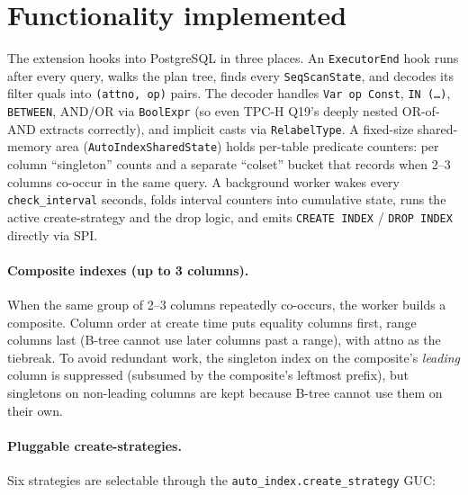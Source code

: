 \documentclass[10pt,a4paper]{article}
\newcommand{\code}[1]{\texttt{\small #1}}
\begin{document}
\section{Functionality implemented}

The extension hooks into PostgreSQL in three places. An
\code{ExecutorEnd} hook runs after every query, walks the plan tree,
finds every \code{SeqScanState}, and decodes its filter quals into
\code{(attno, op)} pairs. The decoder handles \code{Var op Const},
\code{IN (\dots)}, \code{BETWEEN}, AND/OR via \code{BoolExpr} (so even
TPC-H Q19's deeply nested OR-of-AND extracts correctly), and implicit
casts via \code{RelabelType}. A fixed-size shared-memory area
(\code{AutoIndexSharedState}) holds per-table predicate counters: per
column ``singleton'' counts and a separate ``colset'' bucket that
records when 2--3 columns co-occur in the same query. A background
worker wakes every \code{check\_interval} seconds, folds interval
counters into cumulative state, runs the active create-strategy and
the drop logic, and emits \code{CREATE INDEX} / \code{DROP INDEX}
directly via SPI.

\paragraph{Composite indexes (up to 3 columns).} When the same group
of 2--3 columns repeatedly co-occurs, the worker builds a composite.
Column order at create time puts equality columns first, range columns
last (B-tree cannot use later columns past a range), with attno as the
tiebreak. To avoid redundant work, the singleton index on the
composite's \emph{leading} column is suppressed (subsumed by the
composite's leftmost prefix), but singletons on non-leading columns
are kept because B-tree cannot use them on their own.

\paragraph{Pluggable create-strategies.} Six strategies are selectable
through the \code{auto\_index.create\_strategy} GUC:
\end{document}
